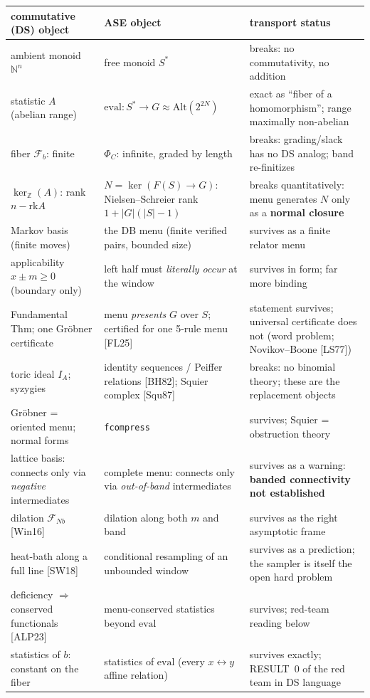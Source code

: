 \documentclass[11pt]{article}
\newcommand{\code}[1]{\texttt{#1}}
\begin{document}
\begin{center}\footnotesize\setlength{\tabcolsep}{4pt}
\begin{tabular}{p{4.6cm}p{5.4cm}p{5.6cm}}
\toprule
\textbf{commutative (DS) object} & \textbf{ASE object} & \textbf{transport status} \\
\midrule
ambient monoid $\mathbb{N}^n$ & free monoid $S^*$ & breaks: no commutativity, no addition \\
statistic $A$ (abelian range) & $\mathrm{eval}: S^*\to G\approx\mathrm{Alt}(2^{2N})$ & exact as ``fiber of a homomorphism''; range maximally non-abelian \\
fiber $\mathcal{F}_b$: finite & $\Phi_C$: infinite, graded by length & breaks: grading/slack has no DS analog; band re-finitizes \\
$\ker_{\mathbb{Z}}(A)$: rank $n-\mathrm{rk}A$ & $N=\ker(F(S)\to G)$: Nielsen--Schreier rank $1+|G|(|S|-1)$ & breaks quantitatively: menu generates $N$ only as a \textbf{normal closure} \\
Markov basis (finite moves) & the DB menu (finite verified pairs, bounded size) & survives as a finite relator menu \\
applicability $x\pm m\ge0$ (boundary only) & left half must \emph{literally occur} at the window & survives in form; far more binding \\
Fundamental Thm; one Gr\"obner certificate & menu \emph{presents} $G$ over $S$; certified for one 5-rule menu [FL25] & statement survives; universal certificate does not (word problem; Novikov--Boone [LS77]) \\
toric ideal $I_A$; syzygies & identity sequences / Peiffer relations [BH82]; Squier complex [Squ87] & breaks: no binomial theory; these are the replacement objects \\
Gr\"obner = oriented menu; normal forms & \code{fcompress} & survives; Squier = obstruction theory \\
lattice basis: connects only via \emph{negative} intermediates & complete menu: connects only via \emph{out-of-band} intermediates & survives as a warning: \textbf{banded connectivity not established} \\
dilation $\mathcal{F}_{Nb}$ [Win16] & dilation along both $m$ and band & survives as the right asymptotic frame \\
heat-bath along a full line [SW18] & conditional resampling of an unbounded window & survives as a prediction; the sampler is itself the open hard problem \\
deficiency $\Rightarrow$ conserved functionals [ALP23] & menu-conserved statistics beyond $\mathrm{eval}$ & survives; red-team reading below \\
statistics of $b$: constant on the fiber & statistics of $\mathrm{eval}$ (every $x\leftrightarrow y$ affine relation) & survives exactly; RESULT~0 of the red team in DS language \\
\bottomrule
\end{tabular}
\end{center}
\end{document}
